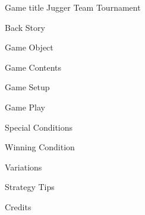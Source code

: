 Game title
Jugger Team Tournament

Back Story

Game Object

Game Contents

Game Setup

Game Play

Special Conditions

Winning Condition

Variations

Strategy Tips

Credits